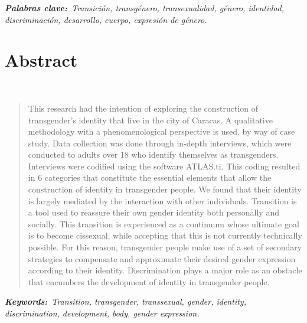 \itshape\textbf{Palabras clave:}\normalfont{}\ Transición, transgénero,
transexualidad, género, identidad, discriminación, desarrollo, cuerpo,
expresión de género.

\chapter{Abstract}

\begin{center}
	\large\scshape\theengtitle\
\end{center}

\begin{quote}
\small
This research had the intention of exploring the construction of
transgender's identity that live in the city of Caracas. A qualitative
methodology with a phenomenological perspective is used, by way of case
study. Data collection was done through in-depth interviews, which were
conducted to adults over 18 who identify themselves as
transgenders. Interviews were codified using the software ATLAS.ti\@. This
coding resulted in 6 categories that constitute the essential elements that
allow the construction of identity in transgender people. We found that their
identity is largely mediated by the interaction with other individuals.
Transition is a tool used to reassure their own gender identity both
personally and socially. This transition is experienced as a continuum whose
ultimate goal is to become cissexual, while accepting that this is not
currently technically possible. For this reason, transgender people make use
of a set of secondary strategies to compensate and approximate their desired
gender expression according to their identity. Discrimination plays a major
role as an obstacle that encumbers the development of identity in transgender
people.
\end{quote}

\itshape\textbf{Keywords:}\normalfont{}\ Transition, transgender, transsexual,
gender, identity, discrimination, development, body, gender expression.
